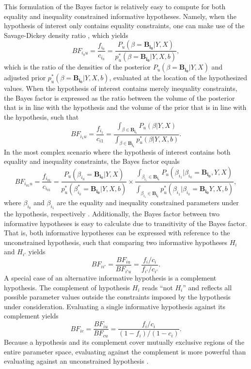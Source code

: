 \documentclass[review, 3p, authoryear]{elsarticle} %
\begin{document}
This formulation of the Bayes factor is relatively easy to compute for both equality and inequality constrained informative hypotheses.
Namely, when the hypothesis of interest only contains equality constraints, one can make use of the Savage-Dickey density ratio \citep{savage_dickey_1971}, which yields
\[
BF_{i_0u} = \frac{f_{i_0}}{c_{i_0}} = \frac{
  P_u(\beta = \boldsymbol{B_{i_0}} | Y, X)
}{
  p_u^*(\beta = \boldsymbol{B_{i_0}} | Y, X, b)
},
\]
which is the ratio of the densities of the posterior \(P_u(\beta = \boldsymbol{B_{i_0}} | Y, X)\) and adjusted prior \(p^*_u(\beta = \boldsymbol{B_{i_0}} | Y, X, b)\), evaluated at the location of the hypothesized values.
When the hypothesis of interest contains merely inequality constraints, the Bayes factor is expressed as the ratio between the volume of the posterior that is in line with the hypothesis and the volume of the prior that is in line with the hypothesis, such that
\[
BF_{i_1u} = \frac{f_{i_1}}{c_{i1}} = 
\frac{
  \int_{\beta \in \boldsymbol{B_{i_1}}} P_u(\beta | Y, X)
}{
  \int_{\beta \in \boldsymbol{B_{i_1}}} p_u^*(\beta | Y, X, b)
}.
\]
In the most complex scenario where the hypothesis of interest contains both equality and inequality constraints, the Bayes factor equals
\[
BF_{i_{01}u} = \frac{f_{i_{01}}}{c_{i_{01}}} = \frac{
  P_u(\beta_{i_0} = \boldsymbol{B_{i_0}} | Y, X)
}{
  p^*_u(\beta^*_{i_0} = \boldsymbol{B_{i_0}} | Y, X, b)
} \times
\frac{
  \int_{\beta_{i_1} \in \boldsymbol{B_{i_1}}} P_u(\beta_{i_1} | \beta_{i_0} = \boldsymbol{B_{i_0}}, Y, X)
}{
  \int_{\beta_{i_1} \in \boldsymbol{B_{i_1}}} p^*_u(\beta_{i_1} | \beta_{i_0} = \boldsymbol{B_{i_0}}Y, X, b)
},
\]
where \(\beta_{i_0}\) and \(\beta_{i_1}\) are the equality and inequality constrained parameters under the hypothesis, respectively \citep{gu_approximated_2018}.
Additionally, the Bayes factor between two informative hypotheses is easy to calculate due to transitivity of the Bayes factor.
That is, both informative hypotheses can be expressed with reference to the unconstrained hypothesis, such that comparing two informative hypotheses \(H_i\) and \(H_{i'}\) yields
\[
BF_{ii'} = \frac{BF_{iu}}{BF_{i'u}} = \frac{f_i / c_i}{f_{i'}/c_{i'}}.
\]
A special case of an alternative informative hypothesis is a complement hypothesis.
The complement of hypothesis \(H_i\) reads ``not \(H_i\)'' and reflects all possible parameter values outside the constraints imposed by the hypothesis under consideration.
Evaluating a single informative hypothesis against its complement yields
\[
BF_{i c} = \frac{BF_{iu}}{BF_{cu}} = \frac{f_i/c_i}{(1 - f_i) / (1 - c_i)}.
\]
Because a hypothesis and its complement cover mutually exclusive regions of the entire parameter space, evaluating against the complement is more powerful than evaluating against an unconstrained hypothesis \citep{klugkist_volker}.
\end{document}
